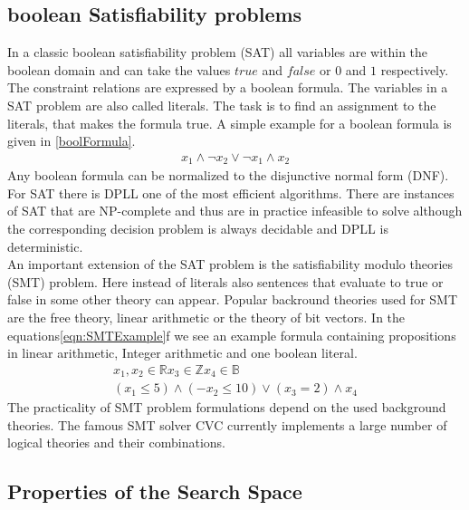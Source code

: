 \subsection{boolean Satisfiability problems}
In a classic boolean satisfiability problem (SAT) all variables are within the boolean domain and can take the values $true$ and $false$ or $0$ and $1$ respectively. The constraint relations are expressed by a boolean formula. The variables in a SAT problem are also called literals. The task is to find an assignment to the literals, that makes the formula true. A simple example for a boolean formula is given in \ref{boolFormula}.
\begin{eqnarray}
x_1 \land \neg x_2  \lor \neg x_1 \land {x_2}
\label{boolFormula}
\end{eqnarray}
Any boolean formula can be normalized to the disjunctive normal form (DNF). For SAT there is DPLL\cite{DPLL} one of the most efficient algorithms. There are instances of SAT that are NP-complete and thus are in practice infeasible to solve although the corresponding decision problem is always decidable and DPLL is deterministic.\\
An important extension of the SAT problem is the satisfiability modulo theories (SMT) problem. Here instead of literals also sentences that evaluate to true or false in some other theory can appear. Popular backround theories used for SMT are the free theory, linear arithmetic or the theory of bit vectors. In the equations\ref{eqn:SMTExample}f we see an example formula containing propositions in linear arithmetic, Integer arithmetic and one boolean literal.
\begin{eqnarray}
\label{eqn:SMTExample}
x_1,x_2\in \mathbb{R} x_3 \in \mathbb{Z} x_4\in \mathbb{B}\\
(x_1\leq 5) \land (-x_2\leq 10) \lor (x_3=2) \land x_4
\end{eqnarray}
The practicality of SMT problem formulations depend on the used background theories. The famous SMT solver CVC currently implements a large number of logical theories and their combinations\cite{cvc}.

\subsection{Properties of the Search Space}
